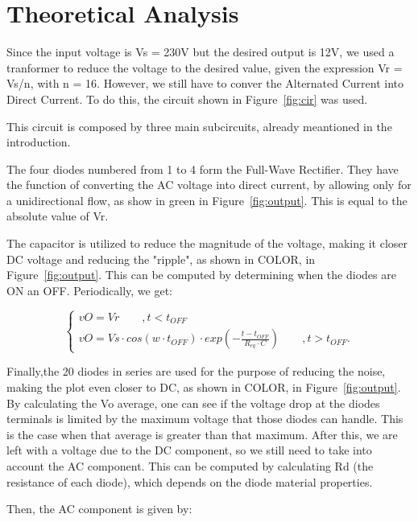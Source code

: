 \section{Theoretical Analysis}
\label{sec:analysis}

Since the input voltage is Vs = 230V but the desired output is 12V, we used a tranformer to reduce the voltage to the desired value, given the expression Vr = Vs/n, with n = 16. However,
we still have to conver the Alternated Current into Direct Current. To do this, the circuit shown in Figure~\ref{fig:cir} was used.

This circuit is composed by three main subcircuits, already meantioned in the introduction. 

The four diodes numbered from 1 to 4 form the Full-Wave Rectifier. They have the function of converting the AC voltage into direct current, by allowing only for a unidirectional flow, as show in green in
 Figure~\ref{fig:output}. This is equal to the absolute value of Vr. 

The capacitor is utilized to reduce the magnitude of the voltage, making it closer DC voltage and reducing the "ripple", as shown in COLOR, in Figure~\ref{fig:output}.
This can be computed by determining when the diodes are ON an OFF. Periodically, we get:

\begin{equation}
    \begin{cases}
        vO = Vr \qquad , t < t_{OFF} \\
	    vO = Vs \cdot cos(w \cdot t_{OFF}) \cdot exp(-\frac{t-t_{OFF}}{R_{eq} \cdot C}) \qquad , t > t_{OFF}.
    
  \label{eq:vo}  
  \end{cases}
\end{equation}


Finally,the 20 diodes in series are used for the purpose of reducing the noise, making the plot even closer to DC, as shown in COLOR, in Figure~\ref{fig:output}.
 By calculating the Vo average, one can see if the voltage drop at the diodes terminals is limited by the maximum voltage that those diodes can handle. 
This is the case when that average is greater than that maximum. After this, we are left with a voltage due to the DC component, 
so we still need to take into account the AC component. This can be computed by calculating Rd (the resistance of each diode), which depends on the diode material properties.

Then, the AC component is given by:

